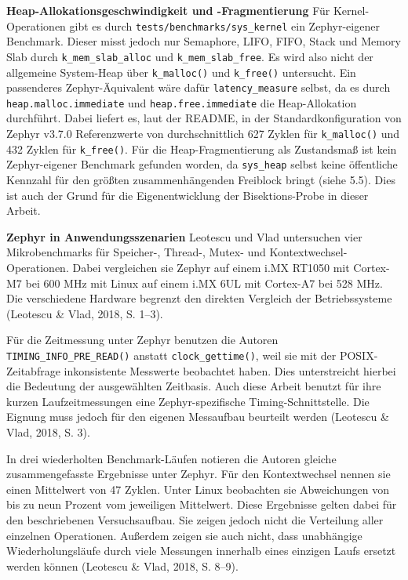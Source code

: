 \textbf{Heap-Allokationsgeschwindigkeit und -Fragmentierung }F{\"u}r Kernel-Operationen gibt es durch \lstinline[style=codeinline]|tests/benchmarks/sys_kernel| ein Zephyr-eigener Benchmark. Dieser misst jedoch nur Semaphore, LIFO, FIFO, Stack und Memory Slab durch \lstinline[style=codeinline]|k_mem_slab_alloc| und \lstinline[style=codeinline]|k_mem_slab_free|. Es wird also nicht der allgemeine System-Heap {\"u}ber \lstinline[style=codeinline]|k_malloc()| und \lstinline[style=codeinline]|k_free()| untersucht. Ein passenderes Zephyr-{\"A}quivalent w{\"a}re daf{\"u}r \lstinline[style=codeinline]|latency_measure| selbst, da es durch \lstinline[style=codeinline]|heap.malloc.immediate| und \lstinline[style=codeinline]|heap.free.immediate| die Heap-Allokation durchf{\"u}hrt. Dabei liefert es, laut der README, in der Standardkonfiguration von Zephyr v3.7.0 Referenzwerte von durchschnittlich 627 Zyklen f{\"u}r \lstinline[style=codeinline]|k_malloc()| und 432 Zyklen f{\"u}r \lstinline[style=codeinline]|k_free()|. F{\"u}r die Heap-Fragmentierung als Zustandsma{\ss} ist kein Zephyr-eigener Benchmark gefunden worden, da \lstinline[style=codeinline]|sys_heap| selbst keine {\"o}ffentliche Kennzahl f{\"u}r den gr{\"o}{\ss}ten zusammenh{\"a}ngenden Freiblock bringt (siehe 5.5). Dies ist auch der Grund f{\"u}r die Eigenentwicklung der Bisektions-Probe in dieser Arbeit.

\textbf{Zephyr in Anwendungsszenarien }Leotescu und Vlad untersuchen vier Mikrobenchmarks f{\"u}r Speicher-, Thread-, Mutex- und Kontextwechsel-Operationen. Dabei vergleichen sie Zephyr auf einem i.MX RT1050 mit Cortex-M7 bei 600 MHz mit Linux auf einem i.MX 6UL mit Cortex-A7 bei 528 MHz. Die verschiedene Hardware begrenzt den direkten Vergleich der Betriebssysteme (Leotescu \& Vlad, 2018, S. 1--3).

F{\"u}r die Zeitmessung unter Zephyr benutzen die Autoren \lstinline[style=codeinline]|TIMING_INFO_PRE_READ()| anstatt \lstinline[style=codeinline]|clock_gettime()|, weil sie mit der POSIX-Zeitabfrage inkonsistente Messwerte beobachtet haben. Dies unterstreicht hierbei die Bedeutung der ausgew{\"a}hlten Zeitbasis. Auch diese Arbeit benutzt f{\"u}r ihre kurzen Laufzeitmessungen eine Zephyr-spezifische Timing-Schnittstelle. Die Eignung muss jedoch f{\"u}r den eigenen Messaufbau beurteilt werden (Leotescu \& Vlad, 2018, S. 3).

In drei wiederholten Benchmark-L{\"a}ufen notieren die Autoren gleiche zusammengefasste Ergebnisse unter Zephyr. F{\"u}r den Kontextwechsel nennen sie einen Mittelwert von 47 Zyklen. Unter Linux beobachten sie Abweichungen von bis zu neun Prozent vom jeweiligen Mittelwert. Diese Ergebnisse gelten dabei f{\"u}r den beschriebenen Versuchsaufbau. Sie zeigen jedoch nicht die Verteilung aller einzelnen Operationen. Au{\ss}erdem zeigen sie auch nicht, dass unabh{\"a}ngige Wiederholungsl{\"a}ufe durch viele Messungen innerhalb eines einzigen Laufs ersetzt werden k{\"o}nnen (Leotescu \& Vlad, 2018, S. 8--9).

